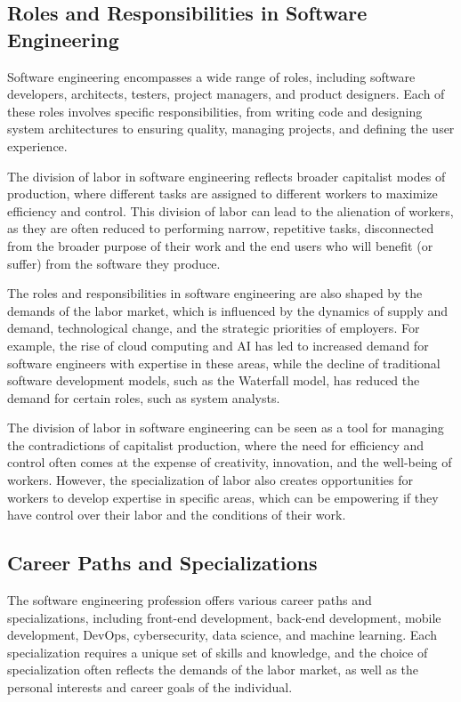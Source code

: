 \begin{refsection}
\begin{multicols}{2}
{\subsection{Roles and Responsibilities in Software Engineering}

Software engineering encompasses a wide range of roles, including software developers, architects, testers, project managers, and product designers. Each of these roles involves specific responsibilities, from writing code and designing system architectures to ensuring quality, managing projects, and defining the user experience.

The division of labor in software engineering reflects broader capitalist modes of production, where different tasks are assigned to different workers to maximize efficiency and control. This division of labor can lead to the alienation of workers, as they are often reduced to performing narrow, repetitive tasks, disconnected from the broader purpose of their work and the end users who will benefit (or suffer) from the software they produce.

The roles and responsibilities in software engineering are also shaped by the demands of the labor market, which is influenced by the dynamics of supply and demand, technological change, and the strategic priorities of employers. For example, the rise of cloud computing and AI has led to increased demand for software engineers with expertise in these areas, while the decline of traditional software development models, such as the Waterfall model, has reduced the demand for certain roles, such as system analysts.

The division of labor in software engineering can be seen as a tool for managing the contradictions of capitalist production, where the need for efficiency and control often comes at the expense of creativity, innovation, and the well-being of workers. However, the specialization of labor also creates opportunities for workers to develop expertise in specific areas, which can be empowering if they have control over their labor and the conditions of their work.

\subsection{Career Paths and Specializations}

The software engineering profession offers various career paths and specializations, including front-end development, back-end development, mobile development, DevOps, cybersecurity, data science, and machine learning. Each specialization requires a unique set of skills and knowledge, and the choice of specialization often reflects the demands of the labor market, as well as the personal interests and career goals of the individual.

}
\end{multicols}
\end{refsection}
